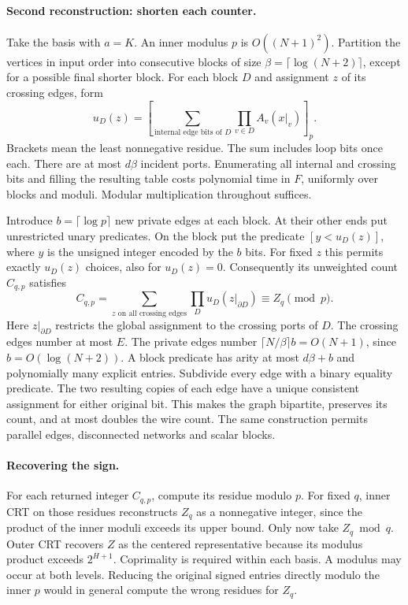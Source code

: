 \documentclass[11pt]{article}
\begin{document}
\paragraph{Second reconstruction: shorten each counter.}
Take the basis with $a=K$. An inner modulus $p$ is $O((N+1)^2)$. Partition the vertices in input order into consecutive blocks of size $\beta=\lceil\log(N+2)\rceil$, except for a possible final shorter block. For each block $D$ and assignment $z$ of its crossing edges, form
\[
 u_D(z)=\left[\sum_{\text{internal edge bits of }D}
                  \prod_{v\in D} A_v(x|_v)\right]_p .
\]
Brackets mean the least nonnegative residue. The sum includes loop bits once each. There are at most $d\beta$ incident ports. Enumerating all internal and crossing bits and filling the resulting table costs polynomial time in $F$, uniformly over blocks and moduli. Modular multiplication throughout suffices.

Introduce $b=\lceil\log p\rceil$ new private edges at each block. At their other ends put unrestricted unary predicates. On the block put the predicate $[y<u_D(z)]$, where $y$ is the unsigned integer encoded by the $b$ bits. For fixed $z$ this permits exactly $u_D(z)$ choices, also for $u_D(z)=0$. Consequently its unweighted count $C_{q,p}$ satisfies
\begin{equation}
 C_{q,p}=\sum_{z\text{ on all crossing edges}}\prod_D u_D(z|_{\partial D})
             \equiv Z_q \pmod p . \label{eq:gadget}
\end{equation}
Here $z|_{\partial D}$ restricts the global assignment to the crossing ports of $D$. The crossing edges number at most $E$. The private edges number $\lceil N/\beta\rceil b=O(N+1)$, since $b=O(\log(N+2))$. A block predicate has arity at most $d\beta+b$ and polynomially many explicit entries. Subdivide every edge with a binary equality predicate. The two resulting copies of each edge have a unique consistent assignment for either original bit. This makes the graph bipartite, preserves its count, and at most doubles the wire count. The same construction permits parallel edges, disconnected networks and scalar blocks.

\paragraph{Recovering the sign.}
For each returned integer $C_{q,p}$, compute its residue modulo $p$. For fixed $q$, inner CRT on those residues reconstructs $Z_q$ as a nonnegative integer, since the product of the inner moduli exceeds its upper bound. Only now take $Z_q\bmod q$. Outer CRT recovers $Z$ as the centered representative because its modulus product exceeds $2^{H+1}$. Coprimality is required within each basis. A modulus may occur at both levels. Reducing the original signed entries directly modulo the inner $p$ would in general compute the wrong residues for $Z_q$.
\end{document}
